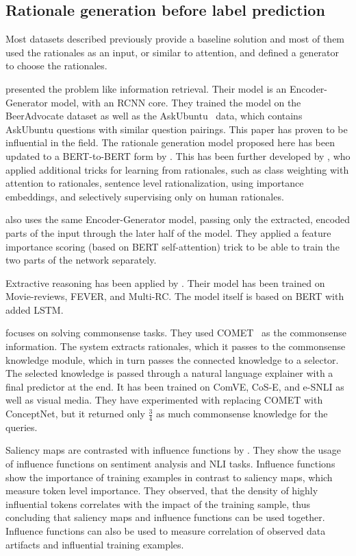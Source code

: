 \documentclass[]{article}
\begin{document}
\subsection{Rationale generation before label prediction}

Most datasets described previously provide a baseline solution and most of them used the rationales as an input, or similar to attention, and defined a generator to choose the rationales.

\cite{Lei:2016} presented the problem like information retrieval. Their model is an Encoder-Generator model, with an RCNN core. They trained the model on the BeerAdvocate dataset as well as the AskUbuntu~\cite{dosSantos:2015} data, which contains AskUbuntu questions with similar question pairings. This paper has proven to be influential in the field. The rationale generation model proposed here has been updated to a BERT-to-BERT form by \cite{DeYoung:2020}. This has been further developed by \cite{Carton:2022}, who applied additional tricks for learning from rationales, such as class weighting with attention to rationales, sentence level rationalization, using importance embeddings, and selectively supervising only on human rationales.

\cite{Jain:2020} also uses the same Encoder-Generator model, passing only the extracted, encoded parts of the input through the later half of the model. They applied a feature importance scoring (based on BERT self-attention) trick to be able to train the two parts of the network separately.

Extractive reasoning has been applied by \cite{Zhang:2021}. Their model has been trained on Movie-reviews, FEVER, and Multi-RC. The model itself is based on BERT with added LSTM.

\cite{Majumder:2021} focuses on solving commonsense tasks. They used COMET~\cite{Bosselut:2019} as the commonsense information. The system extracts rationales, which it passes to the commonsense knowledge module, which in turn passes the connected knowledge to a selector. The selected knowledge is passed through a natural language explainer with a final predictor at the end. It has been trained on ComVE, CoS-E, and e-SNLI as well as visual media. They have experimented with replacing COMET with ConceptNet, but it returned only \(\frac{3}{4}\) as much commonsense knowledge for the queries.

Saliency maps are contrasted with influence functions by \cite{Han:2020}. They show the usage of influence functions on sentiment analysis and NLI tasks. Influence functions show the importance of training examples in contrast to saliency maps, which measure token level importance. They observed, that the density of highly influential tokens correlates with the impact of the training sample, thus concluding that saliency maps and influence functions can be used together. Influence functions can also be used to measure correlation of observed data artifacts and influential training examples.
\end{document}
